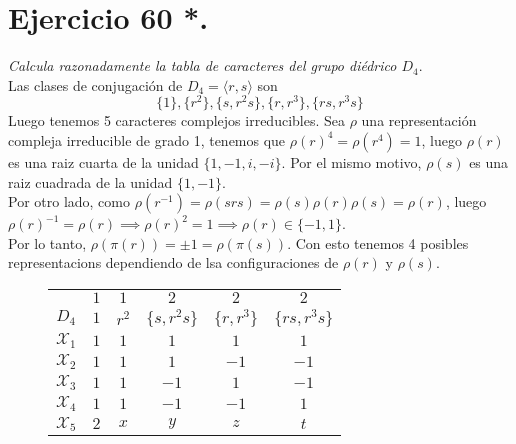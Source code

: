 \section{Ejercicio 60 *.} \emph{Calcula razonadamente la tabla de caracteres del grupo diédrico \(D_{4}\)}.\\

Las clases de conjugación de \(D_{4} = \langle r,s \rangle\) son
\[
  \{1\}, \{r^{2}\}, \{s, r^{2}s\}, \{r, r^{3}\}, \{rs, r^{3}s\}
\]
Luego tenemos 5 caracteres complejos irreducibles. Sea \(\rho\) una representación compleja irreducible de grado 1, tenemos que \(\rho(r)^{4} = \rho(r^{4}) = 1\), luego \(\rho(r)\) es una raiz cuarta de la unidad \(\{1, -1, i, -i\}\). Por el mismo motivo, \(\rho(s)\) es una raiz cuadrada de la unidad \(\{1, -1\}\).\\

Por otro lado, como \(\rho(r^{-1}) = \rho(srs) = \rho(s)\rho(r)\rho(s) = \rho(r)\), luego \(\rho(r)^{-1} = \rho(r) \implies \rho(r)^{2} = 1 \implies \rho(r) \in \{-1, 1\}\).\\

Por lo tanto, \(\rho(\pi(r)) = \pm 1 = \rho(\pi(s))\). Con esto tenemos 4 posibles representacions dependiendo de lsa configuraciones de \(\rho(r)\) y \(\rho(s)\).

\begin{figure}[H]
  \centering
  \begin{tabular}{c|ccccc}
    & \(1\) & \(1\) & \(2\) & \(2\) & \(2\) \\
      \(D_{4}\)  & \(1\)  & \(r^{2}\)  & \(\{s, r^{2}s\}\) & \(\{r,r^{3}\}\)  & \(\{rs, r^{3}s\}\) \\ \hline
      \(\mathcal{X}_{1}\) & \(1\)   &  \(1\)    &     \(1\)      &     \(1\)  & \(1\)       \\
      \(\mathcal{X}_{2}\) & \(1\)   &  \(1\)    &     \(1\)      &     \(-1\)  & \(-1\)       \\
      \(\mathcal{X}_{3}\) & \(1\)   &  \(1\)    &     \(-1\)      &     \(1\)  & \(-1\)       \\
      \(\mathcal{X}_{4}\) & \(1\)   &  \(1\)    &     \(-1\)      &     \(-1\)  & \(1\)       \\
      \(\mathcal{X}_{5}\) & \(2\)   &  \(x\)    &     \(y\)      &     \(z\)  & \(t\)       \\
    \end{tabular}
\end{figure}

